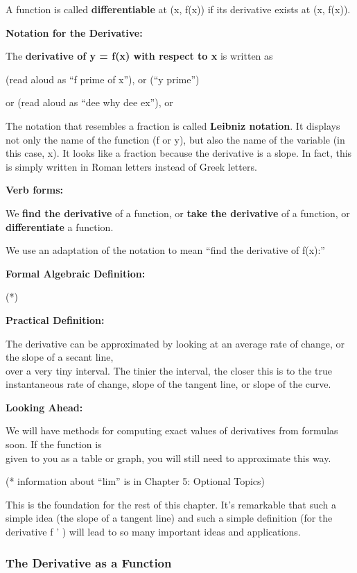 A function is called \textbf{differentiable} at (x, f(x)) if its
derivative exists at (x, f(x)).

\textbf{Notation for the Derivative:}

The \textbf{derivative of y = f(x) with respect to x} is written as

(read aloud as ``f prime of x''), or (``y prime'')

or (read aloud as ``dee why dee ex''), or

The notation that resembles a fraction is called \textbf{Leibniz
notation}. It displays not only the name of the function (f or y), but
also the name of the variable (in this case, x). It looks like a
fraction because the derivative is a slope. In fact, this is simply
written in Roman letters instead of Greek letters.

\textbf{Verb forms:}

We \textbf{find the derivative} of a function, or \textbf{take the
derivative} of a function, or \textbf{differentiate} a function.

We use an adaptation of the notation to mean ``find the derivative of
f(x):''

\textbf{Formal Algebraic Definition:}

(*)

\textbf{Practical Definition:}

The derivative can be approximated by looking at an average rate of
change, or the slope of a secant line,\\
over a very tiny interval. The tinier the interval, the closer this is
to the true instantaneous rate of change, slope of the tangent line, or
slope of the curve.

\textbf{Looking Ahead:}

We will have methods for computing exact values of derivatives from
formulas soon. If the function is\\
given to you as a table or graph, you will still need to approximate
this way.

(* information about ``lim'' is in Chapter 5: Optional Topics)

This is the foundation for the rest of this chapter. It's remarkable
that such a simple idea (the slope of a tangent line) and such a simple
definition (for the derivative f ' ) will lead to so many important
ideas and applications.

\subsubsection{The Derivative as a
Function}\label{the-derivative-as-a-function}

